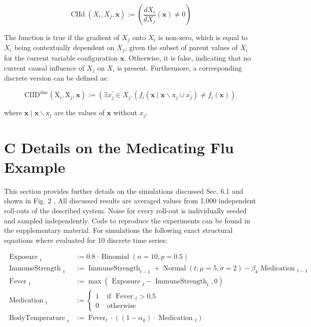 \documentclass[10pt]{article}
\begin{document}
\begin{equation*}
\operatorname{CIId}\left(X_{i}, X_{j}, \mathbf{x}\right):=\left(\frac{d X_{i}}{d X_{j}}(\mathbf{x}) \neq 0\right) \tag{6}
\end{equation*}


The function is true if the gradient of $X_{j}$ onto $X_{i}$ is non-zero, which is equal to $X_{i}$ being contextually dependent on $X_{j}$, given the subset of parent values of $X_{i}$ for the current variable configuration $\mathbf{x}$. Otherwise, it is false, indicating that no current causal influence of $X_{j}$ on $X_{i}$ is present. Furthermore, a corresponding discrete version can be defined as:


\begin{equation*}
\mathrm{CIID}^{\mathrm{disc}}\left(\mathrm{X}_{i}, \mathrm{X}_{j}, \mathbf{x}\right):=\left(\exists x_{j}^{\prime} \in X_{j} .\left(f_{i}\left(\mathbf{x} \mid \mathbf{x} \backslash \mathrm{x}_{j} \cup x_{j}^{\prime}\right) \neq f_{i}(\mathbf{x})\right)\right. \tag{7}
\end{equation*}


where $\mathbf{x} \mid \mathbf{x} \backslash \mathrm{x}_{j}$ are the values of $\mathbf{x}$ without $x_{j}$.

\section*{C Details on the Medicating Flu Example}
This section provides further details on the simulations discussed Sec. 6.1 and shown in Fig. 2 , All discussed results are averaged values from 1,000 independent roll-outs of the described system. Noise for every roll-out is individually seeded and sampled independently. Code to reproduce the experiments can be found in the supplementary material. For simulations the following exact structural equations where evaluated for 10 discrete time series:


\begin{align*}
\text { Exposure }_{t} & :=0.8 \cdot \operatorname{Binomial}(n=10, p=0.5)  \tag{8}\\
\text { ImmuneStrength }_{t} & :=\operatorname{ImmuneStrength}_{t-1}+\operatorname{Normal}(t ; \mu=5, \sigma=2)-\beta_{k} \text { Medication }_{t-1}  \tag{9}\\
\text { Fever }_{t} & :=\max \left(\text { Exposure }_{t}-\operatorname{ImmuneStrength}_{t}, 0\right)  \tag{10}\\
\text { Medication }_{t} & := \begin{cases}1 & \text { if } \text { Fever }_{t}>0.5 \\
0 & \text { otherwise }\end{cases}  \tag{11}\\
\text { BodyTemperature }_{t} & :=\operatorname{Fever}_{t} \cdot\left(\left(1-\alpha_{k}\right) \cdot \text { Medication }_{t}\right) \tag{12}
\end{align*}
\end{document}
